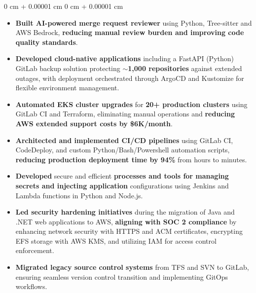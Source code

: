 \documentclass[11pt, letterpaper]{article}
\newenvironment{highlights}{
\begin{itemize}[
topsep=0.10 cm,
parsep=0.10 cm,
partopsep=0pt,
itemsep=0pt,
leftmargin=0 cm + 20pt
]
}{
\end{itemize}
} %
\newenvironment{onecolentry}{
\begin{adjustwidth}{
0 cm + 0.00001 cm
}{
0 cm + 0.00001 cm
}
}{
\end{adjustwidth}
} %
\begin{document}
\vspace{0.10 cm}
\begin{onecolentry}
\begin{highlights}
\item  \textbf{Built AI-powered merge request reviewer} using Python, Tree-sitter and AWS Bedrock, \textbf{reducing manual review burden and improving code quality standards}.

\item \textbf{Developed cloud-native applications} including a FastAPI (Python) GitLab backup solution protecting \textbf{$\sim$1,000 repositories} against extended outages, with deployment orchestrated through ArgoCD and Kustomize for flexible environment management. 
\vspace{0.05 cm}

\item \textbf{Automated EKS cluster upgrades} for \textbf{20+ production clusters} using GitLab CI and Terraform, eliminating manual operations and \textbf{reducing AWS extended support costs by \$6K/month}.  
\vspace{0.05 cm}

\item \textbf{Architected and implemented CI/CD pipelines} using GitLab CI, CodeDeploy, and custom Python/Bash/Powershell automation scripts, \textbf{reducing production deployment time by 94\%} from hours to minutes.  
\vspace{0.05 cm}

\item \textbf{Developed} secure and efficient \textbf{processes and tools for managing secrets and injecting application} configurations using Jenkins and Lambda functions in Python and Node.js.
\vspace{0.05 cm}

\item \textbf{Led security hardening initiatives} during the migration of Java and .NET web applications to AWS, \textbf{aligning with SOC 2 compliance} by enhancing network security with HTTPS and ACM certificates, encrypting EFS storage with AWS KMS, and utilizing IAM for access control enforcement.
\vspace{0.05 cm}

\item \textbf{Migrated legacy source control systems} from TFS and SVN to GitLab, ensuring seamless version control transition and implementing GitOps workflows. 
\vspace{0.05 cm}


\end{highlights}
\end{onecolentry}
\end{document}
